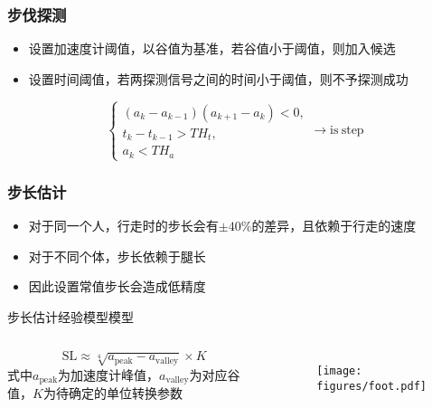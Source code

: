 \documentclass[10pt,xcolor=dvipsnames,fontset=none,punct=CCT]{ctexbeamer}
\begin{document}
\begin{frame}
  \frametitle{步伐探测}
  \begin{itemize}
    \item 设置加速度计阈值，以谷值为基准，若谷值小于阈值，则加入候选
    \item 设置时间阈值，若两探测信号之间的时间小于阈值，则不予探测成功
  \end{itemize}
  \begin{equation}
    \begin{cases}
      (a_k-a_{k-1})(a_{k+1}-a_k)<0,\\
      t_k-t_{k-1}>TH_t,\\
      a_k<TH_a
    \end{cases}\rightarrow\mathrm{is\ step}
  \end{equation}
\end{frame}

\begin{frame}
  \frametitle{步长估计}
  \begin{itemize}
    \item 对于同一个人，行走时的步长会有$\pm 40\%$的差异，且依赖于行走的速度
    \item 对于不同个体，步长依赖于腿长
    \item 因此设置常值步长会造成低精度
  \end{itemize}
  \begin{block}{步长估计经验模型模型\cite{Weinberg2002UsingTA}}
  \begin{columns}
    \[\mathrm{SL}\approx\sqrt[4]{a_\mathrm{peak}-a_\mathrm{valley}}\times K\]
    式中$a_\mathrm{peak}$为加速度计峰值，$a_\mathrm{valley}$为对应谷值，$K$为待确定的单位转换参数
  \begin{figure}
    \centering
    \texttt{[image: figures/foot.pdf]}
  \end{figure}
  \end{columns}
  \end{block}
\end{frame}
\end{document}
